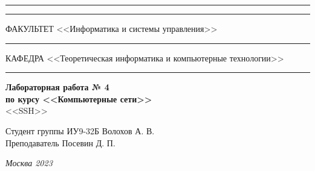 \documentclass[a4paper, 14pt]{extarticle}
\begin{document}
\begin{titlepage}
\vspace{-25pt}
\hspace{-35pt}\rule{\textwidth}{2.3pt}

\vspace*{-20.3pt}
\hspace{-35pt}\rule{\textwidth}{0.4pt}

\vspace{1.5ex}
\hspace{-35pt} \noindent \small ФАКУЛЬТЕТ\hspace{80pt} <<Информатика и системы управления>>

\vspace*{-16pt}
\hspace{47pt}\rule{0.83\textwidth}{0.4pt}

\vspace{0.5ex}
\hspace{-35pt} \noindent \small КАФЕДРА\hspace{50pt} <<Теоретическая информатика и компьютерные технологии>>

\vspace*{-16pt}
\hspace{30pt}\rule{0.866\textwidth}{0.4pt}
  
\vspace{11em}

\begin{center}
\Large {\bf Лабораторная работа № 4} \\ 
\large {\bf по курсу <<Компьютерные сети>>} \\
\large <<SSH>> 
\end{center}\normalsize

\vspace{8em}


\begin{flushright}
  {Студент группы ИУ9-32Б Волохов А. В. \hspace*{15pt}\\ 
  \vspace{2ex}
  Преподаватель Посевин Д. П.\hspace*{15pt}}
\end{flushright}

\bigskip

\vfill
 

\begin{center}
\textsl{Москва 2023}
\end{center}
\end{titlepage}
\end{document}
